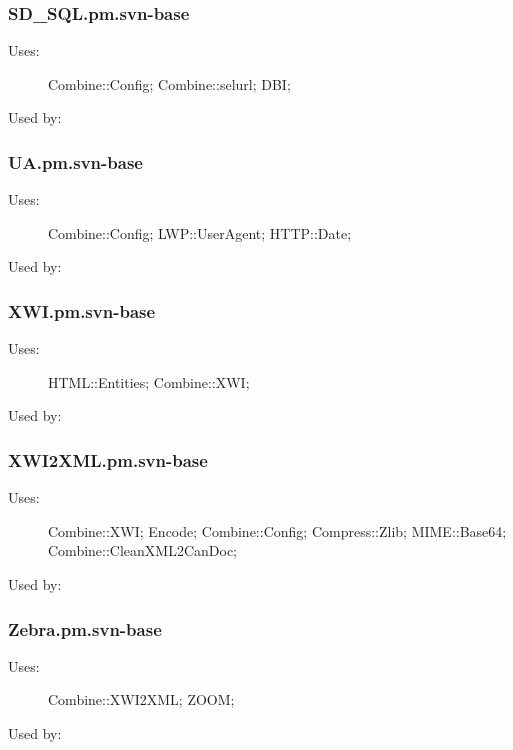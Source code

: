 \subsubsection{SD\_SQL.pm.svn-base}
\begin{description}
\item[Uses:] Combine::Config; Combine::selurl; DBI; 

\item[Used by:] 

\end{description}
\subsubsection{UA.pm.svn-base}
\begin{description}
\item[Uses:] Combine::Config; LWP::UserAgent; HTTP::Date; 

\item[Used by:] 

\end{description}
\subsubsection{XWI.pm.svn-base}
\begin{description}
\item[Uses:] HTML::Entities; Combine::XWI; 

\item[Used by:] 

\end{description}
\subsubsection{XWI2XML.pm.svn-base}
\begin{description}
\item[Uses:] Combine::XWI; Encode; Combine::Config; Compress::Zlib; MIME::Base64; Combine::CleanXML2CanDoc; 

\item[Used by:] 

\end{description}
\subsubsection{Zebra.pm.svn-base}
\begin{description}
\item[Uses:] Combine::XWI2XML; ZOOM; 

\item[Used by:] 

\end{description}
